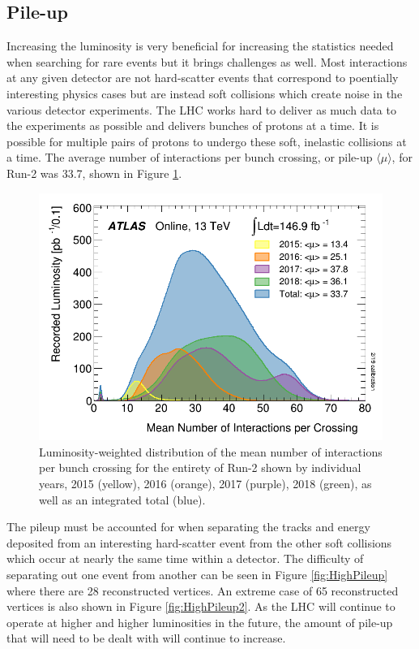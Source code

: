 \subsection{Pile-up}

Increasing the luminosity is very beneficial for increasing the statistics needed when searching for rare events but it brings challenges as well.  Most interactions at any given detector are not hard-scatter events that correspond to poentially interesting physics cases but are instead soft collisions which create noise in the various detector experiments.  The LHC works hard to deliver as much data to the experiments as possible and delivers bunches of protons at a time.  It is possible for multiple pairs of protons to undergo these soft, inelastic collisions at a time.  The average number of interactions per bunch crossing, or pile-up $\langle{\mu}\rangle$, for Run-2 was 33.7, shown in Figure \ref{fig:ATLASmeanIntperCrossing}. 
\begin{figure}[ht!]
	\centering
	\includegraphics[width=.8\columnwidth]{../ThesisImages/LHCImages/meanIntperCrossing.png}
	\caption[Luminosity-weighted distribution of the mean number of interactions per bunch crossing for the entirety of Run-2 shown by individual years, 2015 (yellow), 2016 (orange), 2017 (purple), 2018 (green), as well as an integrated total (blue).]{Luminosity-weighted distribution of the mean number of interactions per bunch crossing for the entirety of Run-2 shown by individual years, 2015 (yellow), 2016 (orange), 2017 (purple), 2018 (green), as well as an integrated total (blue)\cite{ATLASLumi}.
	}
	\label{fig:ATLASmeanIntperCrossing}
\end{figure}
 The pileup must be accounted for when separating the tracks and energy deposited from an interesting hard-scatter event from the other soft collisions which occur at nearly the same time within a detector.  The difficulty of separating out one event from another can be seen in Figure \ref{fig:HighPileup} where there are 28 reconstructed vertices.  An extreme case of 65 reconstructed vertices is also shown in Figure \ref{fig:HighPileup2}.  As the LHC will continue to operate at higher and higher luminosities in the future, the amount of pile-up that will need to be dealt with will continue to increase.  
